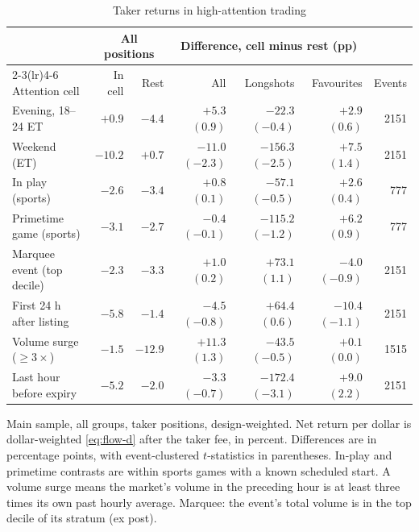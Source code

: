 \begin{table}[htbp]
\centering
\begin{threeparttable}
\caption{Taker returns in high-attention trading}\label{tab:flow-timing}
\footnotesize
\setlength{\tabcolsep}{4pt}
\begin{tabular}{@{}lrrrrrr@{}}
\toprule
 & \multicolumn{2}{c}{All positions} & \multicolumn{3}{c}{Difference, cell minus rest (pp)} & \\
\cmidrule(lr){2-3}\cmidrule(lr){4-6}
Attention cell & In cell & Rest & All & Longshots & Favourites & Events \\
\midrule
Evening, 18--24 ET & $+0.9$ & $-4.4$ & $+5.3$ $(0.9)$ & $-22.3$ $(-0.4)$ & $+2.9$ $(0.6)$ & 2151 \\
Weekend (ET) & $-10.2$ & $+0.7$ & $-11.0$ $(-2.3)$ & $-156.3$ $(-2.5)$ & $+7.5$ $(1.4)$ & 2151 \\
In play (sports) & $-2.6$ & $-3.4$ & $+0.8$ $(0.1)$ & $-57.1$ $(-0.5)$ & $+2.6$ $(0.4)$ & 777 \\
Primetime game (sports) & $-3.1$ & $-2.7$ & $-0.4$ $(-0.1)$ & $-115.2$ $(-1.2)$ & $+6.2$ $(0.9)$ & 777 \\
Marquee event (top decile) & $-2.3$ & $-3.3$ & $+1.0$ $(0.2)$ & $+73.1$ $(1.1)$ & $-4.0$ $(-0.9)$ & 2151 \\
First 24 h after listing & $-5.8$ & $-1.4$ & $-4.5$ $(-0.8)$ & $+64.4$ $(0.6)$ & $-10.4$ $(-1.1)$ & 2151 \\
Volume surge ($\ge 3\times$) & $-1.5$ & $-12.9$ & $+11.3$ $(1.3)$ & $-43.5$ $(-0.5)$ & $+0.1$ $(0.0)$ & 1515 \\
Last hour before expiry & $-5.2$ & $-2.0$ & $-3.3$ $(-0.7)$ & $-172.4$ $(-3.1)$ & $+9.0$ $(2.2)$ & 2151 \\
\bottomrule
\end{tabular}
\begin{tablenotes}\footnotesize
\item Main sample, all groups, taker positions, design-weighted. Net return per dollar is
dollar-weighted \eqref{eq:flow-d} after the taker fee, in percent. Differences are in
percentage points, with event-clustered $t$-statistics in parentheses. In-play and primetime
contrasts are within sports games with a known scheduled start. A volume surge means the
market's volume in the preceding hour is at least three times its own past hourly average.
Marquee: the event's total volume is in the top decile of its stratum (ex post).
\end{tablenotes}
\end{threeparttable}
\end{table}

